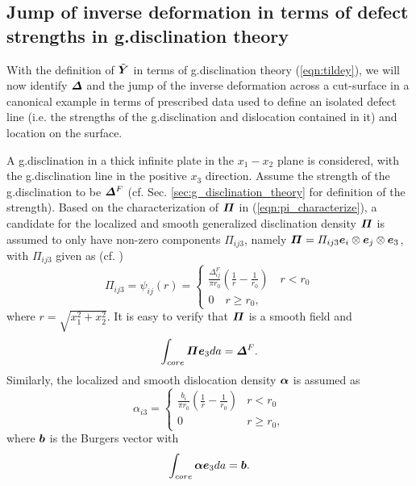 \documentclass[11pt,letterpaper]{article}
\begin{document}
 
 
\subsection{Jump of inverse deformation in terms of defect strengths in g.disclination theory} \label{sec:rel_gdisclin_wein_2}

With the definition of $\tilde{\bfY}$ in terms of g.disclination theory (\ref{eqn:tildey}), we will now identify $\bfDelta$  and the jump of the inverse deformation across a cut-surface in a canonical example in terms of prescribed data used to define an isolated defect line (i.e. the strengths of the g.disclination and dislocation contained in it) and location on the surface.

A g.disclination in a thick infinite plate in the $x_1-x_2$ plane is considered, with the g.disclination line in the positive $x_3$ direction. Assume the strength of the g.disclination to be $\bfDelta^{F}$ (cf. Sec. \ref{sec:g_disclination_theory} for definition of the strength). Based on the characterization of $\bfPi$ in (\ref{eqn:pi_characterize}), a candidate for the localized and smooth generalized disclination density $\bfPi$ is assumed to  only have non-zero components $\Pi_{ij3}$, namely $\bfPi = \Pi_{ij3}\bfe_i \otimes \bfe_j \otimes \bfe_3$, with $\Pi_{ij3}$ given as (cf. \cite{acharya2001model})
\begin{equation*}
\Pi_{ij3} = \psi_{ij}(r)=
\begin{cases}
\frac{\Delta^F_{ij}}{\pi r_0} \left( \frac{1}{r} - \frac{1}{r_0} \right) \quad \text{$r < r_0$} \\
0 \quad \text{$r \ge r_0$},
\end{cases}
\end{equation*} 
where $r=\sqrt{x_1^2+x_2^2}$. It is easy to verify that $\bfPi$ is a smooth field and 
\[
\int_{core} \bfPi \bfe_3 da = \bfDelta^F.
\]
Similarly, the localized and smooth dislocation density $\bfalpha$ is assumed as 
\begin{equation*}
\alpha_{i3} =  
\begin{cases}
\frac{b_i}{\pi r_0}\left( \frac{1}{r}-\frac{1}{r_0} \right) & r < r_0 \\
0 & r \ge r_0,
\end{cases}
\end{equation*}
where $\bfb$ is the Burgers vector with
\[
\int_{core} \bfalpha \bfe_3 da = \bfb.
\]
\end{document}
